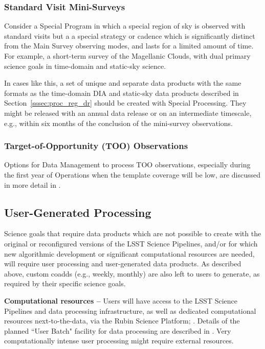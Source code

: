 \subsubsection{Standard Visit Mini-Surveys}

Consider a Special Program in which a special region of sky is observed with standard
visits but a a special strategy or cadence which is significantly distinct from the Main Survey
observing modes, and lasts for a limited amount of time.
For example, a short-term survey of the Magellanic Clouds, with dual primary science
goals in time-domain and static-sky science.

In cases like this, a set of unique and separate data products with the same formats as the 
time-domain DIA and static-sky data products described in Section~\ref{sssec:proc_reg_dr}
should be created with Special Processing.
They might be released with an annual data release or on an intermediate timescale, e.g.,
within six months of the conclusion of the mini-survey observations.

\subsubsection{Target-of-Opportunity (TOO) Observations}

Options for Data Management to process TOO observations, especially during the first year of Operations 
when the template coverage will be low, are discussed in more detail in 
.

\subsection{User-Generated Processing}\label{ssec:proc_user}

Science goals that require data products which are not possible to create with 
the original or reconfigured versions of the LSST Science Pipelines, 
and/or for which new algorithmic development or significant computational resources 
are needed, will require user processing and user-generated data products.
As described above, custom coadds (e.g., weekly, monthly) are also left to users 
to generate, as required by their specific science goals.

\textbf{Computational resources -- }
Users will have access to the LSST Science Pipelines and data processing 
infrastructure, as well as dedicated computational resources next-to-the-data, 
via the Rubin Science Platform; .
Details of the planned ``User Batch" facility for data processing are described in 
.
Very computationally intense user processing might require external resources. 

